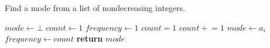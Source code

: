 \documentclass[a4paper, 12pt]{article}
\newcommand{\pluseq}{\mathrel{+}=}
\begin{document}
	
	\begin{algorithm}

		\renewcommand{\thealgorithm}{3.1.29}
		
		\caption{Find a mode from a list of nondecreasing integers.}
		
		\begin{algorithmic}[1]
			
			
			\State $mode \gets \bot$
			\State $count \gets 1$
			\State $frequency \gets 1$
				 {$count = 1$} {$count \pluseq 1$}
				 
					\State $mode \gets a_i$
					\State $frequency \gets count$ 
				\EndIf
			\EndFor
			\State \textbf{return} $mode$
			\EndProcedure
			
		\end{algorithmic}

	\end{algorithm}
\end{document}
